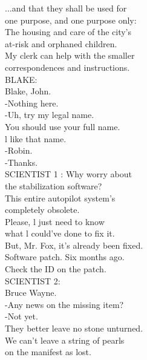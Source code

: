 \documentclass{article}
\begin{document}
\begin{multicols}{3}
...and that they shall be used for\\
one purpose, and one purpose only:\\
The housing and care of the city's\\
at-risk and orphaned children.\\
My clerk can help with the smaller\\
correspondences and instructions.\\
BLAKE:\\
Blake, John.\\
-Nothing here.\\
-Uh, try my legal name.\\
You should use your full name.\\
l like that name.\\
-Robin.\\
-Thanks.\\
SCIENTIST 1 : Why worry about\\
the stabilization software?\\
This entire autopilot system's\\
completely obsolete.\\
Please, l just need to know\\
what l could've done to fix it.\\
But, Mr. Fox, it's already been fixed.\\
Software patch. Six months ago.\\
Check the ID on the patch.\\
SCIENTIST 2:\\
Bruce Wayne.\\
-Any news on the missing item?\\
-Not yet.\\
They better leave no stone unturned.\\
We can't leave a string of pearls\\
on the manifest as lost.\\

\end{multicols}
\end{document}
